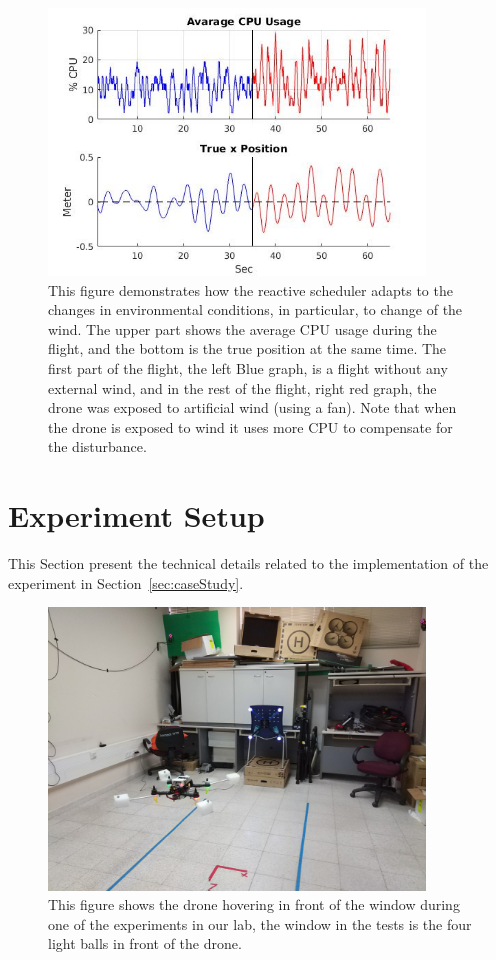 \documentclass[ twoside, 12pt ]{article}
\begin{document}
\begin{figure} %
    \centerline{\includegraphics[width=100mm]{windPlot15.jpg}}
    \caption{This figure demonstrates how the reactive scheduler adapts to the changes in environmental conditions, in particular, to change of the wind. The upper part shows the average CPU usage during the flight, and the bottom is the true position at the same time. The first part of the flight, the left Blue graph, is a flight without any external wind, and in the rest of the flight, right red graph, the drone was exposed to artificial wind (using a fan). Note that when the drone is exposed to wind it uses more CPU to compensate for the disturbance.}
    \label{fig:windPlot}
\end{figure}

\section{Experiment Setup}
\label{sec:Experiment setup}

This Section present the technical details related to the implementation of the experiment in Section~\ref{sec:caseStudy}.

\begin{figure} %
    \centerline{\includegraphics[width=100mm]{hover_in_lab.jpg}}
    \caption{This figure shows the drone hovering in front of the window during one of the experiments in our lab, the window in the tests is the four light balls in front of the drone.}
    \label{fig:hover_in_lab}
\end{figure}
\end{document}
